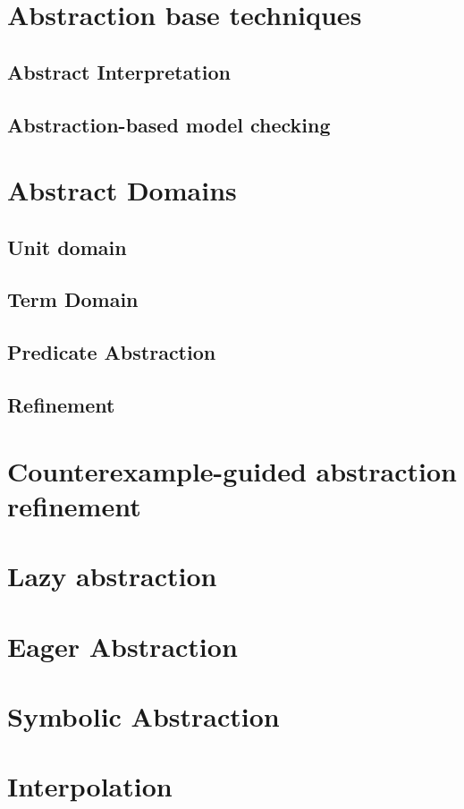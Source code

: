 
\section{Abstraction base techniques}

\subsection{Abstract Interpretation}

\subsection{Abstraction-based model checking}


\section{Abstract Domains}


\subsection{Unit domain}


\subsection{Term Domain}

\subsection{Predicate Abstraction}

\subsection{Refinement}

\section{Counterexample-guided abstraction refinement}



\section{Lazy abstraction}

\section{Eager Abstraction}

\section{Symbolic Abstraction}

\section{Interpolation}

